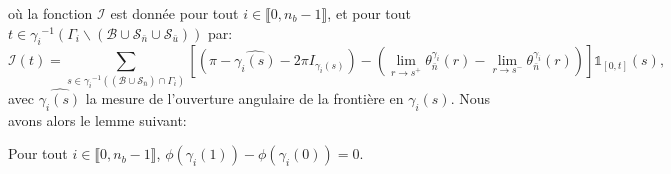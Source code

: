 où la fonction $\mathcal{I}$ est donnée pour tout $i\in\llbracket0, n_b-1\rrbracket$, et pour tout $t\in{\gamma_i}^{-1}(\Gamma_i\backslash(\mathcal{B}\cup\mathcal{S}_{\bar{n}}\cup\mathcal{S}_{\bar{u}}))$ par:
$$
\mathcal{I}(t)=\sum_{s\in{\gamma_i}^{-1}((\mathcal{B}\cup\mathcal{S}_{\bar{n}})\cap\Gamma_i)}\left[\left(\pi-\widehat{\gamma_i(s)}-2\pi I_{\gamma_i(s)}\right)-\left(\lim\limits_{r\rightarrow s^+}\theta^{\gamma_i}_{\bar{n}}(r) - \lim\limits_{r\rightarrow s^-}\theta^{\gamma_i}_{\bar{n}}(r)\right)\right]\mathbb{1}_{[0, t]}(s),
$$
avec $\widehat{\gamma_i(s)}$ la mesure de l'ouverture angulaire de la frontière en $\gamma_i(s)$. Nous avons alors le lemme suivant:

\begin{lemma}
    Pour tout $i\in\llbracket0, n_b-1\rrbracket$, $\phi(\gamma_i(1))-\phi(\gamma_i(0))=0$.
    \label{lem:marvelous_lemma_second}
\end{lemma}
